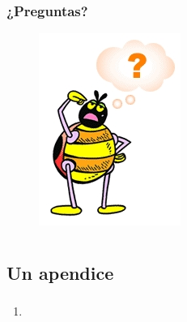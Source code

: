 \documentclass{beamer}
\begin{document}
\begin{frame}
    \transdissolve
    \frametitle{¿Preguntas?}
    \begin{figure}[ht!]
	\begin{center}
	    \includegraphics[scale=.7]{images/pregunta}
	\end{center}
    \end{figure}    
\end{frame}

\appendix

\section{\appendixname}

\frame{\tableofcontents}

\subsection{Un apendice}
\begin{frame}[<+->]
    \transdissolve
    \frametitle{}
    \framesubtitle{}
    \begin{enumerate}
      \item
    \end{enumerate}
\end{frame}
\end{document}
